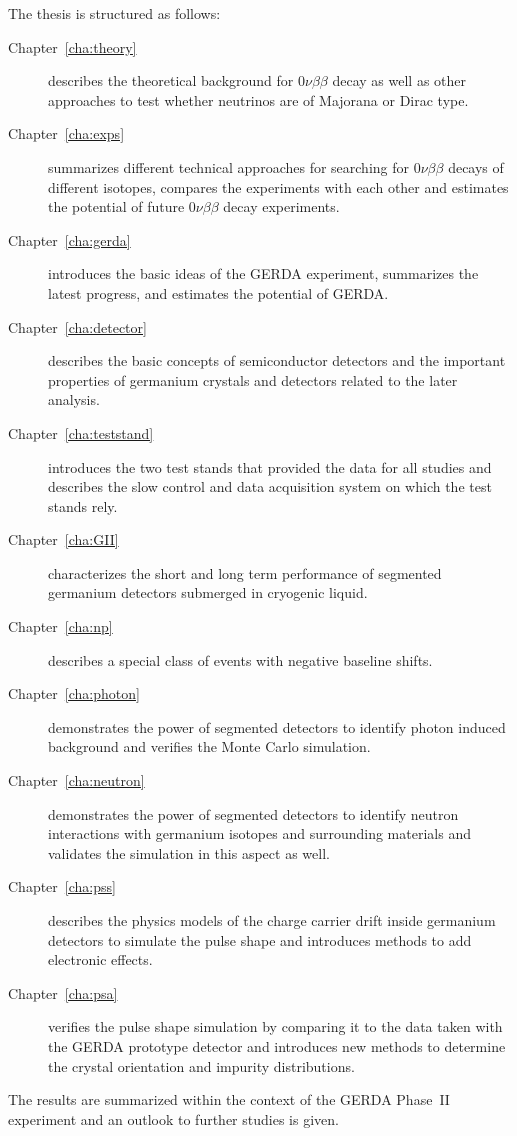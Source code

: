 The thesis is structured as follows:
\begin{description}
\item[Chapter~\ref{cha:theory}] describes the theoretical background
for $0\nu\beta\beta$ decay as well as other approaches to test whether
neutrinos are of Majorana or Dirac type.
\item[Chapter~\ref{cha:exps}] summarizes different technical
approaches for searching for $0\nu\beta\beta$ decays of different
isotopes, compares the experiments with each other and estimates the
potential of future $0\nu\beta\beta$ decay experiments.
\item[Chapter~\ref{cha:gerda}] introduces the basic ideas of the GERDA
experiment, summarizes the latest progress, and estimates the
potential of GERDA.
\item[Chapter~\ref{cha:detector}] describes the basic concepts of
semiconductor detectors and the important properties of germanium
crystals and detectors related to the later analysis.
\item[Chapter~\ref{cha:teststand}] introduces the two test stands that
provided the data for all studies and describes the slow control and
data acquisition system on which the test stands rely.
\item[Chapter~\ref{cha:GII}] characterizes the short and long term
performance of segmented germanium detectors submerged in cryogenic
liquid.
\item[Chapter~\ref{cha:np}] describes a special class of events with
negative baseline shifts.
\item[Chapter~\ref{cha:photon}] demonstrates the power of segmented
detectors to identify photon induced background and verifies the Monte
Carlo simulation.
\item[Chapter~\ref{cha:neutron}] demonstrates the power of segmented
detectors to identify neutron interactions with germanium isotopes and
surrounding materials and validates the simulation in this aspect as
well.
\item[Chapter~\ref{cha:pss}] describes the physics models of the
charge carrier drift inside germanium detectors to simulate the pulse
shape and introduces methods to add electronic effects.
\item[Chapter~\ref{cha:psa}] verifies the pulse shape simulation by
comparing it to the data taken with the GERDA prototype detector and
introduces new methods to determine the crystal orientation and
impurity distributions.
\end{description}
The results are summarized within the context of the GERDA Phase~II
experiment and an outlook to further studies is given.


